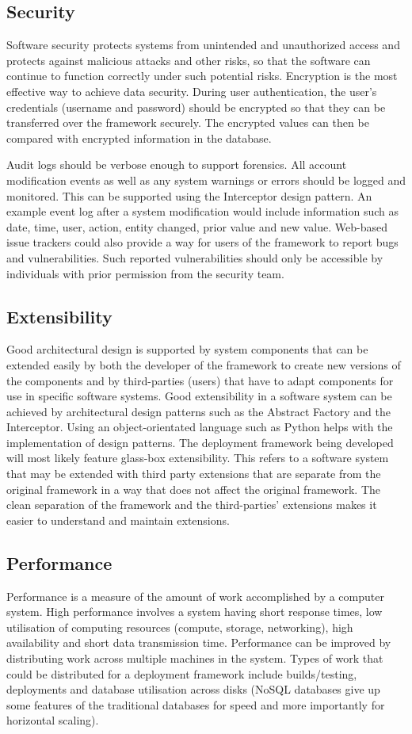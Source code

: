 \subsection{Security}
Software security protects systems from unintended and unauthorized access and protects against malicious attacks and other risks, so that the software can continue to function correctly under such potential risks. Encryption is the most effective way to achieve data security. During user authentication, the user's credentials (username and password) should be encrypted so that they can be transferred over the framework securely. The encrypted values can then be compared with encrypted information in the database.

Audit logs should be verbose enough to support forensics. All account modification events as well as any system warnings or errors should be logged and monitored. This can be supported using the Interceptor design pattern. An example event log after a system modification would include information such as date, time, user, action, entity changed, prior value and new value. Web-based issue trackers could also provide a way for users of the framework to report bugs and vulnerabilities. Such reported vulnerabilities should only be accessible by individuals with prior permission from the security team.

\subsection{Extensibility}
Good architectural design is supported by system components that can be extended easily by both the developer of the framework to create new versions of the components and by third-parties (users) that have to adapt components for use in specific software systems. Good extensibility in a software system can be achieved by architectural design patterns such as the Abstract Factory and the Interceptor. Using an object-orientated language such as Python helps with the implementation of design patterns. The deployment framework being developed will most likely feature glass-box extensibility. This refers to a software system that may be extended with third party extensions that are separate from the original framework in a way that does not affect the original framework. The clean separation of the framework and the third-parties' extensions makes it easier to understand and maintain extensions. \cite{glassbox}

\subsection{Performance}
Performance is a measure of the amount of work accomplished by a computer system. High performance involves a system having short response times, low utilisation of computing resources (compute, storage, networking), high availability and short data transmission time. Performance can be improved by distributing work across multiple machines in the system. Types of work that could be distributed for a deployment framework include builds/testing, deployments and database utilisation across disks (NoSQL databases give up some features of the traditional databases for speed and more importantly for horizontal scaling).

